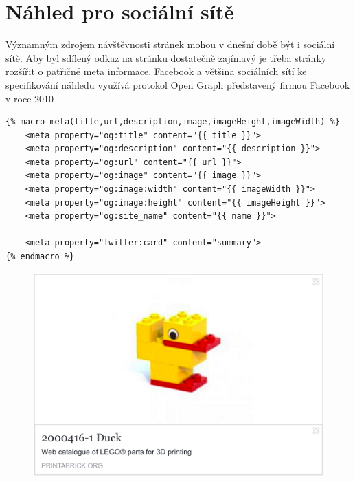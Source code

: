 \section{Náhled pro sociální sítě}
Významným zdrojem návštěvnosti stránek mohou v dnešní době být i sociální sítě. Aby byl sdílený odkaz na stránku dostatečně zajímavý je třeba stránky rozšířit o patřičné meta informace. Facebook a většina sociálních sítí ke specifikování náhledu využívá protokol Open Graph představený firmou Facebook v roce 2010 \autocite{opengraph}.

\begin{listing}[htbp]
  \begin{verbatim}
{% macro meta(title,url,description,image,imageHeight,imageWidth) %}
    <meta property="og:title" content="{{ title }}">
    <meta property="og:description" content="{{ description }}">
    <meta property="og:url" content="{{ url }}">
    <meta property="og:image" content="{{ image }}">
    <meta property="og:image:width" content="{{ imageWidth }}">
    <meta property="og:image:height" content="{{ imageHeight }}">
    <meta property="og:site_name" content="{{ name }}">

    <meta property="twitter:card" content="summary">
{% endmacro %}
  \end{verbatim}
  \caption{\label{opengraph-meta}}
\end{listing}

\begin{figure}[htbp]
        \centering
        \includegraphics[width=\textwidth,height=\textheight,keepaspectratio]{images/fbshare.png}
        \caption{\label{facebook-share}}
\end{figure}